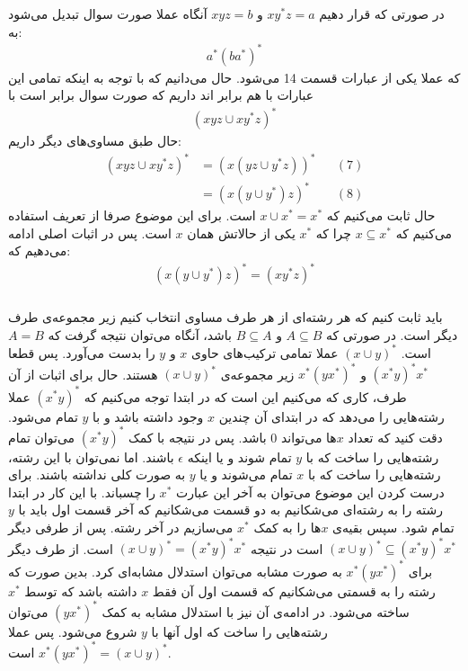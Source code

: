 \subsubsection{}
در صورتی که قرار دهیم
$xy^*z = a$
و
$xyz = b$
آنگاه عملا صورت سوال تبدیل می‌شود به:
\begin{gather*}
    a^*(ba^*)^*
\end{gather*}
که عملا یکی از عبارات قسمت
14
می‌شود. حال می‌دانیم که با توجه به اینکه تمامی این عبارات با هم برابر اند داریم که صورت سوال برابر است با
\begin{gather*}
    (xyz \cup xy^*z)^*
\end{gather*}
حال طبق مساوی‌های دیگر داریم:
\begin{align*}
    (xyz \cup xy^*z)^* &= (x(yz \cup y^*z))^* && (7)\\
    &= (x(y \cup y^*)z)^* && (8)
\end{align*}
حال ثابت می‌کنیم که
$x \cup x^* = x^*$
است. برای این موضوع صرفا از تعریف استفاده می‌کنیم که
$x \subseteq x^*$
چرا که
$x^*$
یکی از حالاتش همان
$x$
است. پس در اثبات اصلی ادامه می‌دهیم که:
\begin{gather*}
    (x(y \cup y^*)z)^* = (xy^*z)^*
\end{gather*}
\subsubsection{}
باید ثابت کنیم که هر رشته‌ای از هر طرف مساوی انتخاب کنیم زیر مجموعه‌ی طرف دیگر است. در صورتی که
$A \subseteq B$ و $B \subseteq A$
باشد، آنگاه می‌توان نتیجه گرفت که
$A = B$
است.
$(x \cup y)^*$
عملا تمامی ترکیب‌های حاوی
$x$ و $y$
را بدست می‌آورد. پس قطعا
$(x^*y)^*x^*$ و $x^*(yx^*)^*$
زیر مجموعه‌ی
$(x \cup y)^*$
هستند. حال برای اثبات از آن طرف، کاری که می‌کنیم این است که در ابتدا توجه می‌کنیم که
$(x^*y)^*$
عملا رشته‌هایی را می‌دهد که در ابتدای آن چندین
$x$
وجود داشته باشد و با
$y$
تمام می‌شود. دقت کنید که تعداد
$x$ها
می‌تواند 0 باشد. پس در نتیجه با کمک
$(x^*y)^*$
می‌توان تمام رشته‌هایی را ساخت که با
$y$
تمام شوند و یا اینکه
$\epsilon$
باشند. اما نمی‌توان با این رشته، رشته‌هایی را ساخت که با
$x$
تمام می‌شوند و یا
$y$
به صورت کلی نداشته باشند. برای درست کردن این موضوع می‌توان به آخر این عبارت
$x^*$
را چسباند. با این کار در ابتدا رشته را به رشته‌ای می‌شکانیم به دو قسمت می‌شکانیم که آخر قسمت اول باید
با
$y$
تمام شود. سپس بقیه‌ی
$x$ها
را به کمک
$x^*$
می‌سازیم در آخر رشته. پس از طرفی دیگر
$(x \cup y)^* \subseteq (x^*y)^*x^*$
است در نتیجه
$(x \cup y)^* = (x^*y)^*x^*$
است. از طرف دیگر برای
$x^*(yx^*)^*$
به صورت مشابه می‌توان استدلال مشابه‌ای کرد. بدین صورت که رشته را به قسمتی می‌شکانیم که قسمت اول آن فقط
$x$
داشته باشد که توسط
$x^*$
ساخته می‌شود. در ادامه‌ی آن نیز با استدلال مشابه به کمک
$(yx^*)^*$
می‌توان رشته‌هایی را ساخت که اول آنها با
$y$
شروع می‌شود. پس عملا
$x^*(yx^*)^* = (x \cup y)^*$
است.